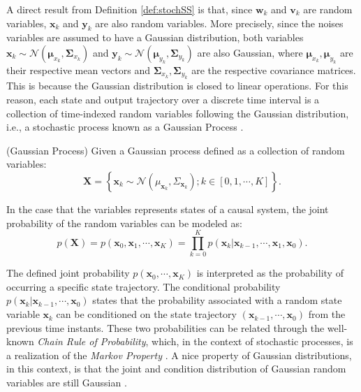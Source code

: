 \documentclass[a4paper,11pt]{book}
\numberwithin{figure}{chapter}
\numberwithin{equation}{chapter}
\numberwithin{table}{chapter}
\theoremstyle{definition}
\newtheorem{definition}{Definition}[chapter]
\newcounter{boxed-theorem}
\newcounter{boxed-lemma}
\newcounter{boxed-definition}
\newenvironment{boxed-definition}[1]
{\colorlet{shadecolor}{pastelYellow!15} \begin{shaded} \begin{definition}{#1}}
{\end{definition} \end{shaded}}
\newcounter{boxed-example}
\begin{document}
A direct result from Definition \ref{def:stochSS} is that, since $\bm{w}_k$ and $\bm{v}_k$ are random variables, $\bm{x}_k$ and $\bm{y}_k$ are also random variables. More precisely, since the noises variables are assumed to have a Gaussian distribution, both variables $\bm{x}_k \sim \mathcal{N}(\bm{\mu}_{x_k}, \bm{\Sigma}_{x_k})$ and $\bm{y}_k \sim \mathcal{N}(\bm{\mu}_{y_k}, \bm{\Sigma}_{y_k})$ are also Gaussian, where $\bm{\mu}_{x_k},\bm{\mu}_{y_k}$ are their respective mean vectors and $\bm{\Sigma}_{x_k},\bm{\Sigma}_{y_k}$ are the respective covariance matrices. This is because the Gaussian distribution is closed to linear operations. For this reason, each state and output trajectory over a discrete time interval is a collection of time-indexed random variables following the Gaussian distribution, i.e., a stochastic process known as a Gaussian Process \cite{Rasmussen:2006}.

\begin{boxed-definition}{(Gaussian Process)} \label{def:gaussianProcess}
    Given a Gaussian process defined as a collection of random variables:
    \begin{equation}
        \bm{X} = \left\{ \bm{x}_k \sim \mathcal{N}(\mu_{\bm{x}_k}, \Sigma_{\bm{x}_k}) ; k \in [0,1,\cdots,K] \right\}
    .\end{equation}
    
    \noindent In the case that the variables represents states of a causal system, the joint probability of the random variables can be modeled as:
    \begin{equation} \label{eq:markovProp01}
        p(\bm{X}) = p(\bm{x}_0, \bm{x}_1, \cdots, \bm{x}_K) = \prod_{k=0}^K p(\bm{x}_k | \bm{x}_{k-1}, \cdots, \bm{x}_1, \bm{x}_0)
    .\end{equation}
\end{boxed-definition}

The defined joint probability $p(\bm{x}_0, \cdots, \bm{x}_K)$ is interpreted as the probability of occurring a specific state trajectory. The conditional probability $p(\bm{x}_k | \bm{x}_{k-1}, \cdots, \bm{x}_0)$ states that the probability associated with a random state variable $\bm{x}_k$ can be conditioned on the state trajectory $(\bm{x}_{k-1}, \cdots, \bm{x}_0)$ from the previous time instants. These two probabilities can be related through the well-known \textit{Chain Rule of Probability}, which, in the context of stochastic processes, is a realization of the \textit{Markov Property} \cite{Stratonovich:1968}. A nice property of Gaussian distributions, in this context, is that the joint and condition distribution of Gaussian random variables are still Gaussian \cite{Sheldon:2010}.
\end{document}
